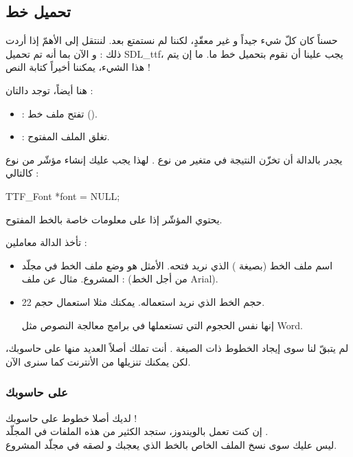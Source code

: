 \subsection{تحميل خط}

حسناً كان كلّ شيء جيداً و غير معقّدٍ، لكننا لم نستمتع بعد. لننتقل إلى الأهمّ إذا أردت ذلك : و الآن بما أنه تم تحميل 
\textenglish{SDL\_ttf}،
يجب علينا أن نقوم بتحميل خط ما. ما إن يتم هذا الشيء، يمكننا أخيراً كتابة النص !

هنا أيضاً، توجد دالتان :
\begin{itemize}
	\item {} :
	تفتح ملف خط
	().
	\item {} : 
	تغلق الملف المفتوح.
\end{itemize}

يجدر بالدالة
أن تخزّن النتيجة في متغير من نوع
.
لهذا يجب عليك إنشاء مؤشّر من نوع
كالتالي :

\begin{Csource}
TTF_Font *font = NULL;
\end{Csource}

يحتوي المؤشّر
إذا على معلومات خاصة بالخط المفتوح.

تأخذ الدالة 
معاملين :

\begin{itemize}
	\item اسم ملف الخط (بصيغة
	)
	الذي نريد فتحه. الأمثل هو وضع ملف الخط في مجلّد المشروع. مثال عن ملف :
	(من أجل الخط
	\textenglish{Arial}).
	\item حجم الخط الذي نريد استعماله. يمكنك مثلا استعمال حجم 22.
	
	إنها نفس الحجوم التي تستعملها في برامج معالجة النصوص مثل
	\textenglish{Word}.
\end{itemize}

لم يتبقّ لنا سوى إيجاد الخطوط ذات الصيغة
.
أنت تملك أصلاً العديد منها على حاسوبك، لكن يمكنك تنزيلها من الأنترنت كما سنرى الآن.

\subsubsection{على حاسوبك}

لديك أصلا خطوط على حاسوبك !\\
إن كنت تعمل بالويندوز، ستجد الكثير من هذه الملفات في المجلّد
.\\
ليس عليك سوى نسخ الملف الخاص بالخط الذي يعجبك و لصقه في مجلّد المشروع. 


